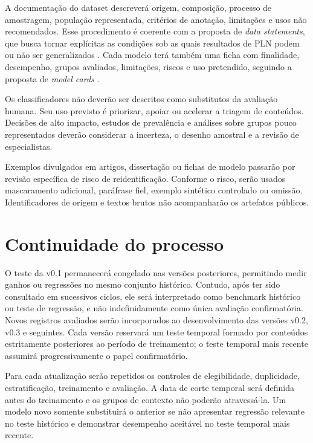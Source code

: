 A documentação do dataset descreverá origem, composição, processo de amostragem,
população representada, critérios de anotação, limitações e usos não recomendados.
Esse procedimento é coerente com a proposta de \textit{data statements}, que
busca tornar explícitas as condições sob as quais resultados de PLN podem ou não
ser generalizados \cite{bender2018datastatements}. Cada modelo terá também uma
ficha com finalidade, desempenho, grupos avaliados, limitações, riscos e uso
pretendido, seguindo a proposta de \textit{model cards}
\cite{mitchell2019modelcards}.

Os classificadores não deverão ser descritos como substitutos da avaliação
humana. Seu uso previsto é priorizar, apoiar ou acelerar a triagem de conteúdos.
Decisões de alto impacto, estudos de prevalência e análises sobre grupos pouco
representados deverão considerar a incerteza, o desenho amostral e a revisão de
especialistas.

Exemplos divulgados em artigos, dissertação ou fichas de modelo passarão por
revisão específica de risco de reidentificação. Conforme o risco, serão usados
mascaramento adicional, paráfrase fiel, exemplo sintético controlado ou omissão.
Identificadores de origem e textos brutos não acompanharão os artefatos públicos.

\section{Continuidade do processo}
\label{sec:continuidade-processo}

O teste da v0.1 permanecerá congelado nas versões posteriores, permitindo medir
ganhos ou regressões no mesmo conjunto histórico. Contudo, após ter sido
consultado em sucessivos ciclos, ele será interpretado como benchmark histórico
ou teste de regressão, e não indefinidamente como única avaliação confirmatória.
Novos registros avaliados serão incorporados ao desenvolvimento das versões
v0.2, v0.3 e seguintes. Cada versão reservará um teste temporal formado por
conteúdos estritamente posteriores ao período de treinamento; o teste temporal
mais recente assumirá progressivamente o papel confirmatório.

Para cada atualização serão repetidos os controles de elegibilidade,
duplicidade, estratificação, treinamento e avaliação. A data de corte temporal
será definida antes do treinamento e os grupos de contexto não poderão atravessá-la.
Um modelo novo somente substituirá o anterior se não apresentar regressão
relevante no teste histórico e demonstrar desempenho aceitável no teste temporal
mais recente.

